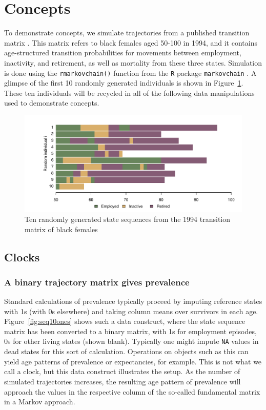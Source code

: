 \documentclass{article}
\begin{document}
\section{Concepts}
To demonstrate concepts, we simulate trajectories from a published transition matrix \citep{Dudel2017}. This matrix refers to black females aged 50-100 in 1994, and it contains age-structured transition probabilities for movements between employment, inactivity, and retirement, as well as mortality from these three states. Simulation is done using the \texttt{rmarkovchain()} function from the \texttt{R} package \texttt{markovchain} \citep{spedicato2017}. A glimpse of the first 10 randomly generated individuals is shown in Figure~\ref{fig:seq10}. These ten individuals will be recycled in all of the following data manipulations used to demonstrate concepts. 

\begin{figure}[ht!]
\centering
\includegraphics[scale=.5]{Figures/Seq10.pdf}
\caption{Ten randomly generated state sequences from the 1994 transition matrix
of black females \citep{Dudel2017}}
\label{fig:seq10}
\end{figure}

\FloatBarrier

\subsection{Clocks}
\label{sec:clocks}

\subsubsection{A binary trajectory matrix gives prevalence}
Standard calculations of prevalence typically proceed by imputing reference states with 1s (with 0s elsewhere) and taking column means over survivors in each age. Figure~\ref{fig:seq10ones} shows such a data construct, where the state sequence matrix has been converted to a binary matrix, with 1s for employment episodes, 0s for other living states (shown blank). Typically one might impute \texttt{NA} values in dead states for this sort of calculation. Operations on objects such as this can yield age patterns of prevalence or expectancies, for example. This is not what we call a clock, but this data construct illustrates the setup. As the number of simulated trajectories increases, the resulting age pattern of prevalence will approach the values in the respective column of the so-called fundamental matrix in a Markov approach.
\end{document}
